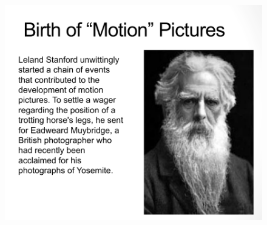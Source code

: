 \documentclass{beamer}
\begin{document}
\begin{frame}
	\begin{figure}
		\centering
		\includegraphics[scale=0.4]{97.jpg}
	\end{figure}
\end{frame}
\end{document}
